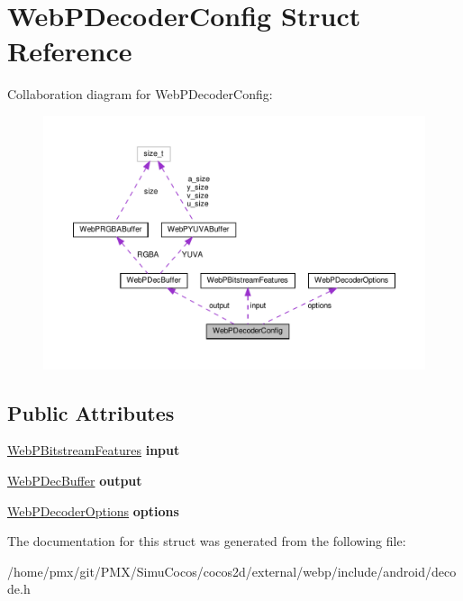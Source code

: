 \hypertarget{structWebPDecoderConfig}{}\section{Web\+P\+Decoder\+Config Struct Reference}
\label{structWebPDecoderConfig}


Collaboration diagram for Web\+P\+Decoder\+Config\+:
\nopagebreak
\begin{figure}[H]
\begin{center}
\leavevmode
\includegraphics[width=350pt]{structWebPDecoderConfig__coll__graph}
\end{center}
\end{figure}
\subsection*{Public Attributes}
\begin{DoxyCompactItemize}
\item 
\mbox{\label{structWebPDecoderConfig_a9bfb9095504e4ccc692651bd12e5bd47}} 
\hyperlink{structWebPBitstreamFeatures}{Web\+P\+Bitstream\+Features} {\bfseries input}
\item 
\mbox{\label{structWebPDecoderConfig_abd6e5ba792753fae7e8a123323f343b4}} 
\hyperlink{structWebPDecBuffer}{Web\+P\+Dec\+Buffer} {\bfseries output}
\item 
\mbox{\label{structWebPDecoderConfig_a06921f434d359574eba37f6aedd33a6a}} 
\hyperlink{structWebPDecoderOptions}{Web\+P\+Decoder\+Options} {\bfseries options}
\end{DoxyCompactItemize}


The documentation for this struct was generated from the following file\+:\begin{DoxyCompactItemize}
\item 
/home/pmx/git/\+P\+M\+X/\+Simu\+Cocos/cocos2d/external/webp/include/android/decode.\+h\end{DoxyCompactItemize}
